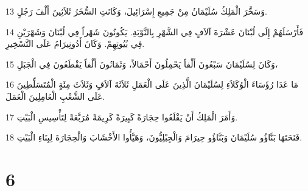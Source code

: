 \par 13 وَسَخَّرَ الْمَلِكُ سُلَيْمَانُ مِنْ جَمِيعِ إِسْرَائِيلَ، وَكَانَتِ السُّخَرُ ثَلاَثِينَ أَلْفَ رَجُلٍ.
\par 14 فَأَرْسَلَهُمْ إِلَى لُبْنَانَ عَشْرَةَ آلاَفٍ فِي الشَّهْرِ بِالنَّوْبَةِ. يَكُونُونَ شَهْراً فِي لُبْنَانَ وَشَهْرَيْنِ فِي بُيُوتِهِمْ. وَكَانَ أَدُونِيرَامُ عَلَى التَّسْخِيرِ.
\par 15 وَكَانَ لِسُلَيْمَانَ سَبْعُونَ أَلْفاً يَحْمِلُونَ أَحْمَالاً، وَثَمَانُونَ أَلْفاً يَقْطَعُونَ فِي الْجَبَلِ،
\par 16 مَا عَدَا رُؤَسَاءَ الْوُكَلاَءِ لِسُلَيْمَانَ الَّذِينَ عَلَى الْعَمَلِ ثَلاَثَةَ آلاَفٍ وَثَلاَثَ مِئَةٍ الْمُتَسَلِّطِينَ عَلَى الشَّعْبِ الْعَامِلِينَ الْعَمَلَ.
\par 17 وَأَمَرَ الْمَلِكُ أَنْ يَقْلَعُوا حِجَارَةً كَبِيرَةً كَرِيمَةً مُرَبَّعَةً لِتَأْسِيسِ الْبَيْتِ.
\par 18 فَنَحَتَهَا بَنَّاؤُو سُلَيْمَانَ وَبَنَّاؤُو حِيرَامَ وَالْجِبْلِيُّونَ، وَهَيَّأُوا الأَخْشَابَ وَالْحِجَارَةَ لِبِنَاءِ الْبَيْتِ.

\chapter{6}

